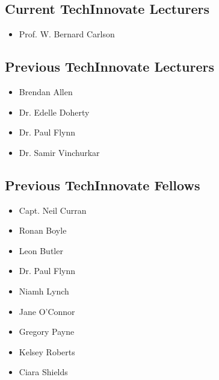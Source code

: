 \documentclass[10pt,a4paper]{res} %
\begin{document}
\begin{resume}
\subsection*{Current TechInnovate Lecturers}

\begin{itemize} \itemsep -2pt
\item Prof. W. Bernard Carlson
\end{itemize}

\subsection*{Previous TechInnovate Lecturers}

\begin{itemize} \itemsep -2pt
\item Brendan Allen
\item Dr. Edelle Doherty
\item Dr. Paul Flynn
\item Dr. Samir Vinchurkar
\end{itemize}

\subsection*{Previous TechInnovate Fellows}

\begin{itemize} \itemsep -2pt
\item Capt. Neil Curran
\item Ronan Boyle
\item Leon Butler
\item Dr. Paul Flynn
\item Niamh Lynch
\item Jane O'Connor
\item Gregory Payne
\item Kelsey Roberts
\item Ciara Shields
\end{itemize}


\vspace{0.2in} %



\end{resume}
\end{document}
